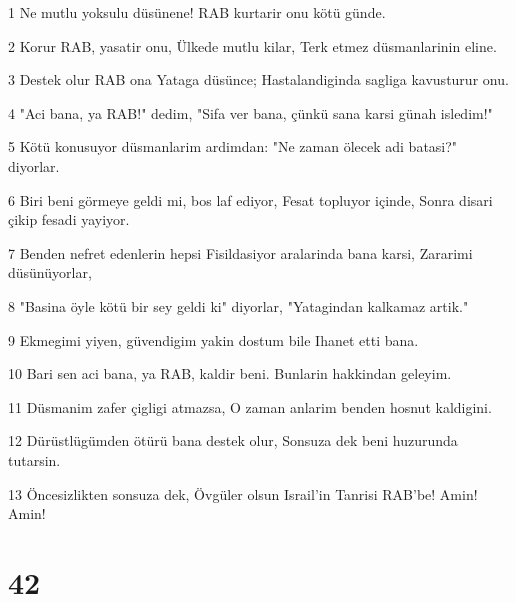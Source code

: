 \par 1 Ne mutlu yoksulu düsünene! RAB kurtarir onu kötü günde.
\par 2 Korur RAB, yasatir onu, Ülkede mutlu kilar, Terk etmez düsmanlarinin eline.
\par 3 Destek olur RAB ona Yataga düsünce; Hastalandiginda sagliga kavusturur onu.
\par 4 "Aci bana, ya RAB!" dedim, "Sifa ver bana, çünkü sana karsi günah isledim!"
\par 5 Kötü konusuyor düsmanlarim ardimdan: "Ne zaman ölecek adi batasi?" diyorlar.
\par 6 Biri beni görmeye geldi mi, bos laf ediyor, Fesat topluyor içinde, Sonra disari çikip fesadi yayiyor.
\par 7 Benden nefret edenlerin hepsi Fisildasiyor aralarinda bana karsi, Zararimi düsünüyorlar,
\par 8 "Basina öyle kötü bir sey geldi ki" diyorlar, "Yatagindan kalkamaz artik."
\par 9 Ekmegimi yiyen, güvendigim yakin dostum bile Ihanet etti bana.
\par 10 Bari sen aci bana, ya RAB, kaldir beni. Bunlarin hakkindan geleyim.
\par 11 Düsmanim zafer çigligi atmazsa, O zaman anlarim benden hosnut kaldigini.
\par 12 Dürüstlügümden ötürü bana destek olur, Sonsuza dek beni huzurunda tutarsin.
\par 13 Öncesizlikten sonsuza dek, Övgüler olsun Israil'in Tanrisi RAB'be! Amin! Amin!

\chapter{42}

